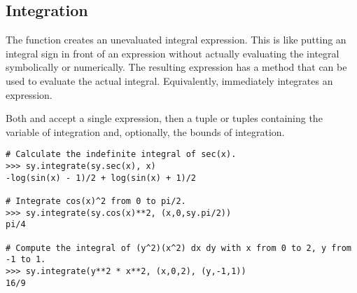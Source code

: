 \subsection*{Integration} %

The function  creates an unevaluated integral expression.
This is like putting an integral sign in front of an expression without actually evaluating the integral symbolically or numerically.
The resulting expression has a  method that can be used to evaluate the actual integral.
Equivalently,  immediately integrates an expression.

Both  and  accept a single expression, then a tuple or tuples containing the variable of integration and, optionally, the bounds of integration.

\begin{lstlisting}
# Calculate the indefinite integral of sec(x).
>>> sy.integrate(sy.sec(x), x)
-log(sin(x) - 1)/2 + log(sin(x) + 1)/2

# Integrate cos(x)^2 from 0 to pi/2.
>>> sy.integrate(sy.cos(x)**2, (x,0,sy.pi/2))
pi/4

# Compute the integral of (y^2)(x^2) dx dy with x from 0 to 2, y from -1 to 1.
>>> sy.integrate(y**2 * x**2, (x,0,2), (y,-1,1))
16/9
\end{lstlisting}

